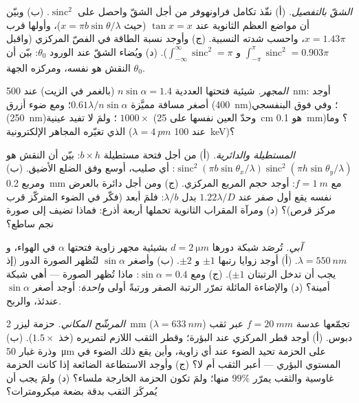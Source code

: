 \begin{exercise}[$\star\star$]\label{exo:b2:diffraction:5}
\emph{الشقّ بالتفصيل.} (أ) نفّذ تكامل فراونهوفر من أجل
الشقّ واحصل على $\operatorname{sinc}^2$. (ب) وبيّن أن مواضع العظم الثانوية
عند $\tan x = x$ (حيث $x = \pi b\sin\theta/\lambda$)، وأولها قرب $x = 1.43\pi$،
واحسب شدته النسبية. (ج) وأوجد نسبة الطاقة في
الفصّ المركزي (واقبل $\int_{-\pi}^\pi\operatorname{sinc}^2 = 0.903\pi$ و
$\int_{-\infty}^\infty\operatorname{sinc}^2 = \pi$). (د) ويُضاء الشقّ عند الورود
$\theta_0$: بيّن أن النقش هو نفسه، ومركزه الجهة $\theta_0$.
\end{exercise}

\begin{exercise}[$\star\star$]\label{exo:b2:diffraction:6}
\emph{المجهر.} شيئية فتحتها العددية $n\sin\alpha = 1.4$
(بالغمر في الزيت) عند \qty{500}{nm}: أوجد أصغر مسافة مميَّزة $0.61\lambda/n\sin
\alpha$؛ ومع ضوء أزرق (\qty{400}{nm})؛ وفي فوق البنفسجي (\qty{250}{nm})؛ ولمَ
لا تفيد عينية $1000\times$ (وحدّ العين نفسها على \qty{25}{cm} هو
\qty{0.1}{mm})؟ وما الذي تغيّره المجاهر الإلكترونية ($\lambda = \qty{4}{pm}$ عند
\qty{100}{keV})؟
\end{exercise}

\begin{exercise}[$\star\star$]\label{exo:b2:diffraction:7}
\emph{المستطيلة والدائرية.} (أ) من أجل فتحة مستطيلة $b \times h$:
بيّن أن النقش هو $\operatorname{sinc}^2(\pi b\sin\theta_x/\lambda)\operatorname{sinc}^2(\pi h
\sin\theta_y/\lambda)$: أي صليب، أوسع وفق الضلع الأضيق. (ب) ومربع
\qty{0.2}{mm} مع $f = \qty{1}{m}$: أوجد حجم المربع المركزي. (ج) ومن أجل
دائرة بالعرض نفسه يقع أول صفر عند $1.22\lambda/D$ بدل $\lambda/b$:
فلمَ أبعد (فكّر في الضوء المتركّز قرب مركز
قرص)؟ (د) ومرآة المقراب الثانوية تحملها أربعة أذرع: فماذا تضيف
إلى صورة نجم ساطع؟
\end{exercise}

\begin{exercise}[$\star\star$]\label{exo:b2:diffraction:8}
\emph{آبي.} تُرصَد شبكة دورها $d = \qty{2}{\micro m}$ بشيئية
مجهر زاوية فتحتها $\alpha$ في الهواء، و $\lambda = \qty{550}{nm}$.
(أ) أوجد زوايا رتبها $\pm1$ و $\pm2$. (ب) وأصغر $\sin\alpha$ لتُظهر الصورة
الدور (إذ يجب أن تدخل الرتبتان $\pm1$). (ج) ومع $\sin\alpha = 0.4$: ماذا
تُظهر الصورة --- أهي شبكة أمينة؟ (د) والإضاءة المائلة
تمرّر الرتبة الصفر ورتبةً أولى \emph{واحدة}:
أوجد أصغر $\sin\alpha$ عندئذ، والربح.
\end{exercise}

\begin{exercise}[$\star\star$]\label{exo:b2:diffraction:9}
\emph{المرشّح المكاني.} حزمة ليزر \qty{2}{mm} ($\lambda = \qty{633}{nm}$)
تجمّعها عدسة $f = \qty{20}{mm}$ عبر ثقب دبوس. (أ) أوجد قطر
 المركزي عند البؤرة؛ وقطر الثقب اللازم لتمريره
(خذ $1.5\times$). (ب) وذرة غبار \qty{50}{\micro m} على الحزمة
تحيد الضوء عند أي زاوية، وأين يقع ذلك الضوء في
المستوي البؤري --- أعبر الثقب أم لا؟ (ج) وأوجد الاستطاعة الضائعة إذا كانت الحزمة
غاوسية والثقب يمرّر $99\%$ منها؛ ولمَ تكون الحزمة الخارجة
ملساء؟ (د) ولمَ يجب أن يُمركَز الثقب بدقة بضعة
ميكرومترات؟
\end{exercise}

